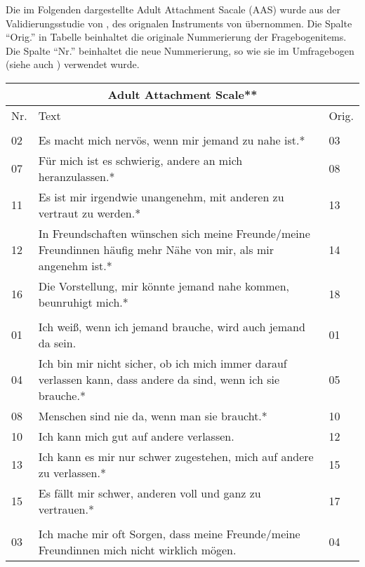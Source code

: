 
Die im Folgenden dargestellte Adult Attachment Sacale (AAS) wurde aus der Validierungsstudie von , des orignalen Instruments von  übernommen. Die Spalte \enquote{Orig.} in Tabelle  beinhaltet die originale Nummerierung der Fragebogenitems. Die Spalte \enquote{Nr.} beinhaltet die neue Nummerierung, so wie sie im Umfragebogen (siehe auch ) verwendet wurde.


\begin{table}[htbp]
\begin{tabular}{|l | m{30em} | p{2em}|} 
  \hline
  \multicolumn{3}{|c|}{\textbf{Adult Attachment Scale**}}\\
  \hline
  Nr. & Text & Orig. \\ 
  \hline\hline
  \rowcolor{lightgray}
  \multicolumn{3}{|l|}{Nähe}\\
  \hline
  02 & Es macht mich nervös, wenn mir jemand zu nahe ist.* & 03 \\
  07 & Für mich ist es schwierig, andere an mich heranzulassen.* & 08 \\
  11 & Es ist mir irgendwie unangenehm, mit anderen zu vertraut zu werden.* & 13 \\
  12 & In Freundschaften wünschen sich meine Freunde/meine Freundinnen häufig mehr Nähe von mir, als mir angenehm ist.* & 14 \\
  16 & Die Vorstellung, mir könnte jemand nahe kommen, beunruhigt mich.* & 18 \\
  \hline
  \rowcolor{lightgray} \multicolumn{3}{|l|}{Vertrauen}\\
  \hline
  01 & Ich weiß, wenn ich jemand brauche, wird auch jemand da sein. & 01 \\
  04 & Ich bin mir nicht sicher, ob ich mich immer darauf verlassen kann, dass andere da sind, wenn ich sie brauche.* & 05\\
  08 & Menschen sind nie da, wenn man sie braucht.* & 10 \\
  10 & Ich kann mich gut auf andere verlassen. & 12\\
  13 & Ich kann es mir nur schwer zugestehen, mich auf andere zu verlassen.* & 15\\
  15 & Es fällt mir schwer, anderen voll und ganz zu vertrauen.* & 17\\
  \hline
  \rowcolor{lightgray} \multicolumn{3}{|l|}{Angst}\\
  \hline
  03 & Ich mache mir oft Sorgen, dass meine Freunde/meine Freundinnen mich nicht wirklich mögen. & 04\\

\end{tabular}
\end{table}

